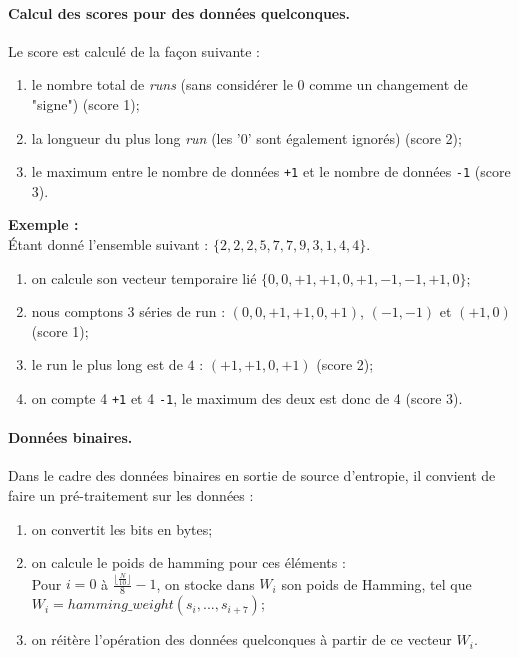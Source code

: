 \paragraph{Calcul des scores pour des données quelconques.\\}
Le score est calculé de la façon suivante : 
\begin{enumerate}
\item le nombre total de \textit{runs} (sans considérer le 0 comme un changement de "signe") (score 1);
\item la longueur du plus long \textit{run} (les '0' sont également ignorés) (score 2);
\item le maximum entre le nombre de données \texttt{+1} et le nombre de données \texttt{-1} (score 3).\\

\end{enumerate}


\textbf{Exemple :} \\
Étant donné l'ensemble suivant : $\lbrace 2, 2, 2, 5, 7, 7, 9, 3, 1, 4, 4 \rbrace$. 
\begin{enumerate}
\item on calcule son vecteur temporaire lié $ \lbrace 0, 0, +1, +1, 0, +1, -1, -1, +1, 0 \rbrace $;
\item nous comptons 3 séries de run : $(0,0,+1,+1,0,+1)$, $(-1,-1)$ et $(+1,0)$ (score 1);
\item le run le plus long est de $4$ : $(+1,+1,0,+1)$ (score 2);
\item on compte 4 \texttt{+1} et 4 \texttt{-1}, le maximum des deux est donc de 4 (score 3).\\
\end{enumerate}


\paragraph{Données binaires.\\}
Dans le cadre des données binaires en sortie de source d'entropie, il convient de faire un pré-traitement sur les données : 
\begin{enumerate}
\item on convertit les bits en bytes;
\item on calcule le poids de hamming pour ces éléments : \\
Pour $i=0$ à $\frac{\lfloor\frac{N}{10}\rfloor}{8} -1 $, on stocke dans $W_i$ son poids de Hamming, tel que $W_i=hamming\_weight(s_i,...,s_{i+7})$;
\item on réitère l'opération des données quelconques à partir de ce vecteur $W_i$.\\
\end{enumerate}

